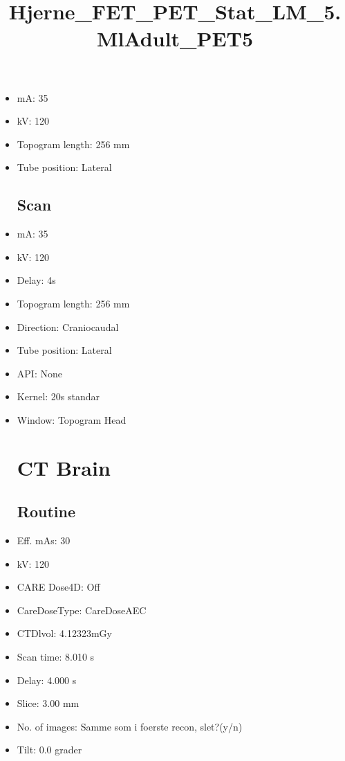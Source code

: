 \documentclass[12pt]{article}
\title{Hjerne\_FET\_PET\_Stat\_LM\_5.MlAdult\_PET5}
\begin{document}
\maketitle
\newpage
\tableofcontents
\newpage
{}


\begin{itemize}\section{Topogram}
\subsection{Routine}
\item mA: 35\item kV: 120\item Topogram length: 256 mm\item Tube position: Lateral
\subsection{Scan}\item mA: 35\item kV: 120\item Delay: 4s\item Topogram length: 256 mm\item Direction: Craniocaudal\item Tube position: Lateral\item API: None\item Kernel: 20s standar\item Window: Topogram Head
\section{CT Brain}
\subsection{Routine}
\item Eff. mAs: 30\item kV: 120\item CARE Dose4D: Off\item CareDoseType: CareDoseAEC\item CTDlvol: 4.12323mGy\item Scan time: 8.010 s\item Delay: 4.000 s\item Slice: 3.00 mm\item No. of images: Samme som i foerste recon, slet?(y/n)\item Tilt: 0.0 grader

\end{itemize}
\end{document}
